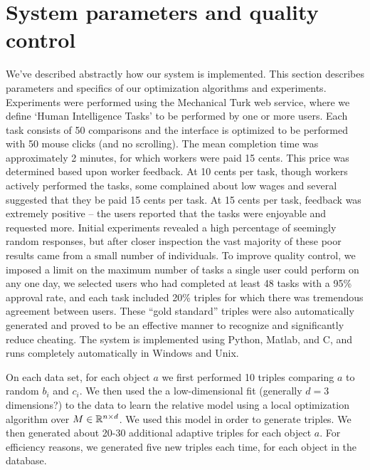 \documentclass{article}
\begin{document}
\section{System parameters and quality control}\label{sec:params}
We've described abstractly how our system is implemented.  This section describes parameters and specifics of our optimization algorithms and experiments.  Experiments were performed using the Mechanical Turk web service, where we define `Human Intelligence Tasks' to be performed by one or more users.  Each task consists of 50 comparisons and the interface is optimized to be performed with 50 mouse clicks (and no scrolling).  The mean completion time was approximately 2 minutes, for which workers were paid 15 cents.  This price was determined based upon worker feedback.  At 10 cents per task, though workers actively performed the tasks, some complained about low wages and several suggested that they be paid 15 cents per task.  At 15 cents per task, feedback was extremely positive -- the users reported that the tasks were enjoyable and requested more.  Initial experiments revealed a high percentage of seemingly random responses, but after closer inspection the vast majority of these poor results came from a small number of individuals.  To improve quality control, we imposed a limit on the maximum number of tasks a single user could perform on any one day, we selected users who had completed at least 48 tasks with a 95\% approval rate, and each task included 20\% triples for which there was tremendous agreement between users.  These ``gold standard'' triples were also automatically generated and proved to be an effective manner to recognize and significantly reduce cheating.  The system is implemented using Python, Matlab, and C, and runs completely automatically in Windows and Unix.

On each data set, for each object $a$ we first performed 10 triples comparing $a$ to random $b_i$ and $c_i$.  We then used the a low-dimensional fit (generally $d=3$ dimensions?) to the data to learn the relative model using a local optimization algorithm over $M \in \mathbb{R}^{n\times d}$.  We used this model in order to generate triples.  We then generated about 20-30 additional adaptive triples for each object $a$.  For efficiency reasons, we generated five new triples each time, for each object in the database.
\end{document}
